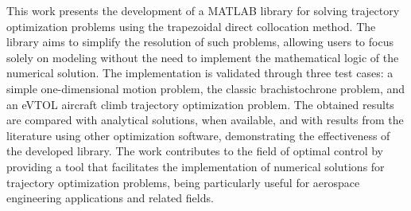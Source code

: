 This work presents the development of a MATLAB library for solving trajectory optimization problems using the trapezoidal direct collocation method. The library aims to simplify the resolution of such problems, allowing users to focus solely on modeling without the need to implement the mathematical logic of the numerical solution. The implementation is validated through three test cases: a simple one-dimensional motion problem, the classic brachistochrone problem, and an eVTOL aircraft climb trajectory optimization problem. The obtained results are compared with analytical solutions, when available, and with results from the literature using other optimization software, demonstrating the effectiveness of the developed library. The work contributes to the field of optimal control by providing a tool that facilitates the implementation of numerical solutions for trajectory optimization problems, being particularly useful for aerospace engineering applications and related fields.